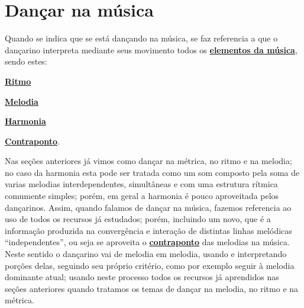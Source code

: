 
\newpage
\section{Dançar na música}
\label{subsec:dancamusica}
Quando se indica que se está dançando na música, se faz referencia a que 
o dançarino interpreta mediante seus movimento todos os 
\hyperref[sec:elementosmusica]{\textbf{elementos da música}}, 
sendo estes:
\begin{inparaitem}
\item \hyperref[sec:pos:Ritmo]{\textbf{Ritmo}}
\item \hyperref[sec:pos:Melodia]{\textbf{Melodia}}
\item \hyperref[sec:pos:Harmonia]{\textbf{Harmonia}}
\item \hyperref[sec:pos:Contraponto]{\textbf{Contraponto}}.
\end{inparaitem}

Nas seções anteriores já vimos como dançar na métrica, no ritmo e na melodia;
no caso da harmonia esta pode ser tratada como um som composto 
pela soma de varias melodias interdependentes, simultâneas e com uma estrutura rítmica
comumente simples; porém, em geral a harmonia é pouco aproveitada pelos dançarinos.   
Assim, quando falamos de  dançar na música, fazemos referencia ao uso de todos os recursos já estudados;
porém, incluindo um novo, 
que é a informação produzida na convergência e interação de distintas linhas melódicas ``independentes'',
 ou seja se aproveita o 
\hyperref[sec:pos:Contraponto]{\textbf{contraponto}} das melodias na música. 
Neste sentido o dançarino vai de melodia em melodia, 
usando e interpretando porções delas, seguindo seu próprio critério,
como por exemplo seguir à melodia dominante atual;
usando neste processo todos os recursos já aprendidos nas seções anteriores 
quando tratamos os temas de dançar 
na melodia, no ritmo e na métrica.

